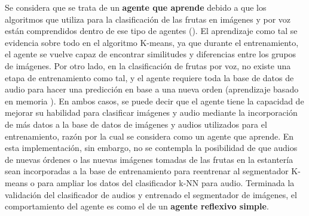 \documentclass[a4paper, 12pt]{article}
\begin{document}
Se considera que se trata de un \textbf{agente que aprende} debido a que los algoritmos que utiliza para la clasificación de las frutas en imágenes y por voz están comprendidos dentro de ese tipo de agentes (\cite{referencia}). El aprendizaje como tal se evidencia sobre todo en el algoritmo K-means, ya que durante el entrenamiento, el agente se vuelve capaz de encontrar similitudes y diferencias entre los grupos de imágenes. Por otro lado, en la clasificación de frutas por voz, no existe una etapa de entrenamiento como tal, y el agente requiere toda la base de datos de audio para hacer una predicción en base a una nueva orden (aprendizaje basado en memoria \cite{referencia}). En ambos casos, se puede decir que el agente tiene la capacidad de mejorar su habilidad para clasificar imágenes y audio mediante la incorporación de más datos a la base de datos de imágenes y audios utilizados para el entrenamiento, razón por la cual se considera como un agente que aprende. En esta implementación, sin embargo, no se contempla la posibilidad de que audios de nuevas órdenes o las nuevas imágenes tomadas de las frutas en la estantería sean incorporadas a la base de entrenamiento para reentrenar al segmentador K-means o para ampliar los datos del clasificador k-NN para audio. Terminada la validación del clasificador de audios y entrenado el segmentador de imágenes, el comportamiento del agente es como el de un \textbf{agente reflexivo simple}.
\end{document}
